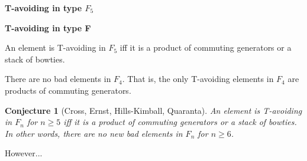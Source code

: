 \documentclass[9pt,handout]{beamer}
\newtheorem{conjecture}{Conjecture}
\newcommand{\<}{\langle}
\renewcommand{\>}{\rangle}
\begin{document}
\begin{frame}{\textbf{T-avoiding in type $F_{5}$}}
\end{frame}




\begin{frame}{\textbf{T-avoiding in type F}}

\begin{theorem}
An element is T-avoiding in $F_{5}$ iff it is a product of commuting generators or a stack of bowties. 
\end{theorem}

\pause

\begin{corollary}
There are no bad elements in $F_{4}$.  That is, the only T-avoiding elements in $F_{4}$ are products of commuting generators.
\end{corollary}

\pause

\begin{conjecture}[Cross, Ernst, Hills-Kimball, Quaranta]
An element is T-avoiding in $F_{n}$ for $n\geq 5$ iff it is a product of commuting generators or a stack of bowties.  In other words, there are no new bad elements in $F_{n}$ for $n\geq 6$.
\end{conjecture}

\vspace{2em}
\pause

However...

\end{frame}


\end{document}
